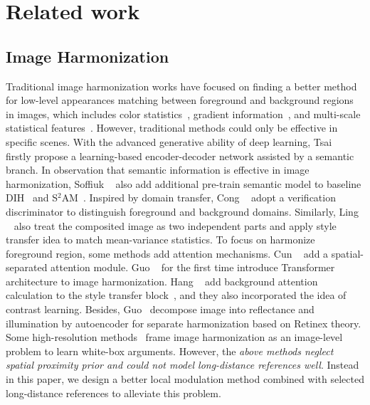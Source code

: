 \documentclass[10pt,twocolumn,letterpaper]{article}
\begin{document}
\section{Related work}

\subsection{Image Harmonization} Traditional image harmonization works have focused on finding a better method for low-level appearances matching between foreground and background regions in images, which includes color statistics~\cite{reinhard2001color,pitie2007linear,xue2012understanding},  gradient information~\cite{jia2006drag,perez2003poisson,tao2010error}, and multi-scale statistical features~\cite{sunkavalli2010multi,lalonde2007using}. However, traditional methods could only be effective in specific scenes. With the advanced generative ability of deep learning, Tsai \etal~\cite{Tsai_2017_CVPR} firstly propose a learning-based encoder-decoder network assisted by a semantic branch. In observation that semantic information is effective in image harmonization, Soffiuk \etal~\cite{Sofiiuk_2021_WACV} also add additional pre-train semantic model to baseline DIH~\cite{Tsai_2017_CVPR} and S$^{2}$AM~\cite{cun_2020_TIP}. Inspired by domain transfer, Cong \etal~\cite{Cong_2020_CVPR} adopt a verification discriminator to distinguish foreground and background domains. Similarly, Ling \etal~\cite{Ling_2021_CVPR} also treat the composited image as two independent parts and apply style transfer idea to match mean-variance statistics. To focus on harmonize foreground region, some methods add attention mechanisms. Cun \etal~\cite{cun_2020_TIP} add a spatial-separated attention module. Guo \etal~\cite{Guo_2021_ICCV} for the first time introduce Transformer architecture to image harmonization. Hang \etal~\cite{Hang_2022_CVPR} add background attention calculation to the style transfer block~\cite{Ling_2021_CVPR}, and they also incorporated the idea of contrast learning. Besides, Guo\etal~\cite{Guo_2021_CVPR} decompose image into reflectance and illumination by autoencoder for separate harmonization based on Retinex theory. Some high-resolution methods~\cite{Harmonizer,xue2022dccf} frame image harmonization as an image-level problem to learn white-box arguments. However, the \emph{above methods neglect spatial proximity prior and could not model long-distance references well}. Instead in this paper, we design a better local modulation method combined with selected long-distance references to alleviate this problem.
\end{document}
